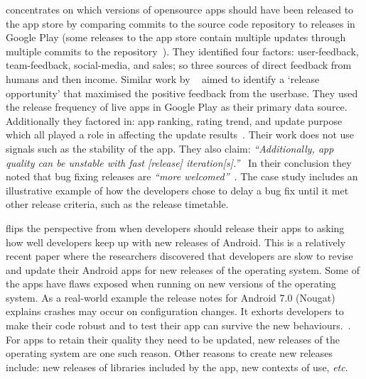  concentrates on which versions of opensource apps should have been released to the app store by comparing commits to the source code repository to releases in Google Play (some releases to the app store contain multiple updates through multiple commits to the repository~). They identified four factors: user-feedback, team-feedback, social-media, and sales; so three sources of direct feedback from humans and then income. Similar work by ~ aimed to identify a `release opportunity' that maximised the positive feedback from the userbase. They used the release frequency of live apps in Google Play as their primary data source. Additionally they factored in: app ranking, rating trend, and update purpose which all played a role in affecting the update results~. Their work does not use signals such as the stability of the app. They also claim: \emph{``Additionally, app quality can be unstable with fast [release] iteration[s].''}~ In their conclusion they noted that bug fixing releases are \emph{``more welcomed''}~. The  case study includes an illustrative example of how the developers chose to delay a bug fix until it met other release criteria, such as the release timetable. %


 flips the perspective from when developers should release their apps to asking how well developers keep up with new releases of Android. This is a relatively recent paper where the researchers discovered that developers are slow to revise and update their Android apps for new releases of the operating system. Some of the apps have flaws exposed when running on new versions of the operating system. As a real-world example the release notes for Android 7.0 (Nougat) explains crashes may occur on configuration changes. It exhorts developers to make their code robust and to test their app can survive the new behaviours.~.
For apps to retain their quality they need to be updated, new releases of the operating system are one such reason. Other reasons to create new releases include: new releases of libraries included by the app, new contexts of use, \emph{etc}.


